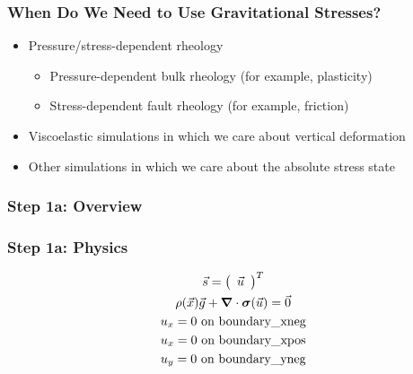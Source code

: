 \documentclass[aspectratio=169]{beamer}
\begin{document}
\begin{frame}
  \frametitle{When Do We Need to Use Gravitational Stresses?}
  \summary{}

  \begin{itemize}
  \item Pressure/stress-dependent rheology
    \begin{itemize}
    \item Pressure-dependent bulk rheology (for example, plasticity)
    \item Stress-dependent fault rheology (for example, friction)
    \end{itemize}
  \item Viscoelastic simulations in which we care about vertical deformation
  \item Other simulations in which we care about the absolute stress state
  \end{itemize}
  
\end{frame}


\begin{frame}
  \frametitle{Step 1a: Overview}

      
\end{frame}


\begin{frame}
  \frametitle{Step 1a: Physics}
  \summary{}

  \begin{minipage}{0.3\textwidth}
    {\scriptsize
    \begin{gather*}
    \vec{s} = \left(\begin{array}{c} \vec{u} \end{array}\right)^T \\
    \rho(\vec{x}) \vec{g} + \bm{\nabla} \cdot \bm{\sigma}(\vec{u}) = \vec{0} \\
    u_x = 0 \text{ on boundary\_xneg} \\
    u_x = 0 \text{ on boundary\_xpos} \\
    u_y = 0 \text{ on boundary\_yneg} \\
    \end{gather*}}
  \end{minipage}
  \hfill
  \begin{minipage}{0.67\textwidth}
  \end{minipage}
      
\end{frame}
\end{document}
